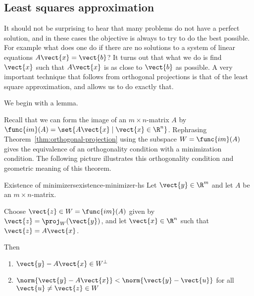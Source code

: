 \subsection{Least squares approximation}

It should not be surprising to hear that many problems do not have a
perfect solution, and in these cases the objective is always to try to
do the best possible. For example what does one do if there are no
solutions to a system of linear equations $A\vect{x}=\vect{b}$? It
turns out that what we do is find $\vect{x}$ such that $A\vect{x}$ is
as close to $\vect{b}$ as possible. A very important technique that
follows from orthogonal projections is that of the least square
approximation, and allows us to do
exactly that.

We begin with a lemma.

Recall that we can form the image of an $m \times n$-matrix $A$ by
$\func{im}(A) = \set{A\vect{x} \mid \vect{x} \in
\R^n }$. Rephrasing Theorem~\ref{thm:orthogonal-projection} using
the subspace $W=\func{im}(A)$  gives the
equivalence of an orthogonality condition with a minimization
condition. The following picture
illustrates this orthogonality condition and geometric meaning of this
theorem.

\begin{center}
\end{center}

\begin{theorem}{Existence of minimizers}{existence-minimizer-hs}\label{existence-minimizer-hs}
Let $\vect{y}\in \R^{m}$ and let $A$ be an $m\times n$-matrix.

Choose $\vect{z}\in W= \func{im}(A)$ given by $\vect{z} =
\proj_{W}(\vect{y})$, and let $\vect{x} \in \R^{n}$ such that $\vect{z}=A\vect{x}$.

Then
\begin{enumerate}
\item $\vect{y} - A\vect{x} \in W^{\perp}$
\item $\norm{\vect{y} - A\vect{x}} < \norm{\vect{y} - \vect{u}}$ for all $\vect{u} \neq \vect{z} \in W$
\end{enumerate}
\end{theorem}

